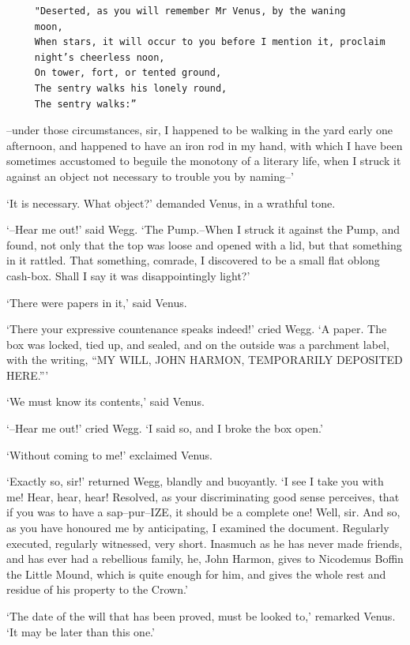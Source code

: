 \begin{verbatim}
     "Deserted, as you will remember Mr Venus, by the waning
     moon,
     When stars, it will occur to you before I mention it, proclaim
     night’s cheerless noon,
     On tower, fort, or tented ground,
     The sentry walks his lonely round,
     The sentry walks:”
\end{verbatim}

--under those circumstances, sir, I happened to be walking in the yard
early one afternoon, and happened to have an iron rod in my hand, with
which I have been sometimes accustomed to beguile the monotony of a
literary life, when I struck it against an object not necessary to
trouble you by naming--’

‘It is necessary. What object?’ demanded Venus, in a wrathful tone.

‘--Hear me out!’ said Wegg. ‘The Pump.--When I struck it against the
Pump, and found, not only that the top was loose and opened with a lid,
but that something in it rattled. That something, comrade, I discovered
to be a small flat oblong cash-box. Shall I say it was disappointingly
light?’

‘There were papers in it,’ said Venus.

‘There your expressive countenance speaks indeed!’ cried Wegg. ‘A
paper. The box was locked, tied up, and sealed, and on the outside was
a parchment label, with the writing, “MY WILL, JOHN HARMON, TEMPORARILY
DEPOSITED HERE.”’

‘We must know its contents,’ said Venus.

‘--Hear me out!’ cried Wegg. ‘I said so, and I broke the box open.’

‘Without coming to me!’ exclaimed Venus.

‘Exactly so, sir!’ returned Wegg, blandly and buoyantly. ‘I see I take
you with me! Hear, hear, hear! Resolved, as your discriminating good
sense perceives, that if you was to have a sap--pur--IZE, it should be
a complete one! Well, sir. And so, as you have honoured me by
anticipating, I examined the document. Regularly executed, regularly
witnessed, very short. Inasmuch as he has never made friends, and has
ever had a rebellious family, he, John Harmon, gives to Nicodemus Boffin
the Little Mound, which is quite enough for him, and gives the whole
rest and residue of his property to the Crown.’

‘The date of the will that has been proved, must be looked to,’ remarked
Venus. ‘It may be later than this one.’

